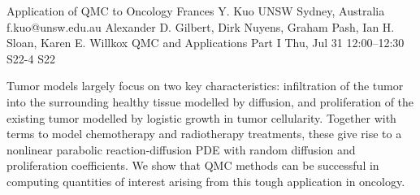 \documentclass[12pt,lettersize,oneside]{book} %
\begin{document}
\begin{talk}
  {Application of QMC to Oncology}%
  {Frances Y. Kuo}%
  {UNSW Sydney, Australia}%
  {f.kuo@unsw.edu.au}%
  {Alexander D. Gilbert, Dirk Nuyens, Graham Pash, Ian H. Sloan, Karen E. Willkox}%
  {QMC and Applications Part I}%
  {Thu, Jul 31 12:00--12:30}%
  {S22-4}%
  {S22}%
    
   
Tumor models largely focus on two key characteristics: infiltration of the tumor into the surrounding healthy tissue modelled by diffusion, and proliferation of the existing tumor modelled by logistic growth in tumor cellularity. Together with terms to model chemotherapy and radiotherapy treatments, these give rise to a nonlinear parabolic reaction-diffusion PDE with random diffusion and proliferation coefficients. We show that QMC methods can be successful in computing quantities of interest arising from this tough application in oncology.

%
%
\end{talk}
\end{document}
